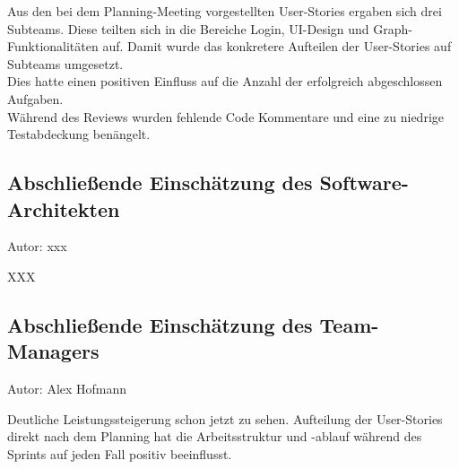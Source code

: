 Aus den bei dem Planning-Meeting vorgestellten User-Stories ergaben sich drei Subteams. Diese teilten sich in die Bereiche Login, UI-Design und Graph-Funktionalitäten auf. Damit wurde das konkretere Aufteilen der User-Stories auf Subteams umgesetzt. \\
Dies hatte einen positiven Einfluss auf die Anzahl der erfolgreich abgeschlossen Aufgaben. \\
Während des Reviews wurden fehlende Code Kommentare und eine zu niedrige Testabdeckung benängelt.


\subsection{Abschließende Einschätzung des Software-Architekten}
{\small Autor: xxx}

XXX

\subsection{Abschließende Einschätzung des Team-Managers}
{\small Autor: Alex Hofmann}

Deutliche Leistungssteigerung schon jetzt zu sehen. Aufteilung der User-Stories direkt nach dem Planning hat die Arbeitsstruktur und -ablauf während des Sprints auf jeden Fall positiv beeinflusst.

